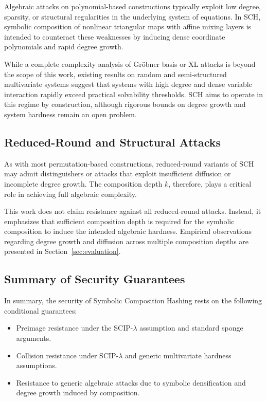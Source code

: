 ﻿\documentclass[english]{aucmcs}
\begin{document}
Algebraic attacks on polynomial-based constructions typically exploit low degree, sparsity, or structural regularities in the underlying system of equations. In SCH, symbolic composition of nonlinear triangular maps with affine mixing layers is intended to counteract these weaknesses by inducing dense coordinate polynomials and rapid degree growth.

While a complete complexity analysis of Gr\"obner basis or XL attacks is beyond the scope of this work, existing results on random and semi-structured multivariate systems suggest that systems with high degree and dense variable interaction rapidly exceed practical solvability thresholds. SCH aims to operate in this regime by construction, although rigorous bounds on degree growth and system hardness remain an open problem.



\subsection{Reduced-Round and Structural Attacks}

As with most permutation-based constructions, reduced-round variants of SCH may admit distinguishers or attacks that exploit insufficient diffusion or incomplete degree growth. The composition depth $k$, therefore, plays a critical role in achieving full algebraic complexity.

This work does not claim resistance against all reduced-round attacks. Instead, it emphasizes that sufficient composition depth is required for the symbolic composition to induce the intended algebraic hardness. Empirical observations regarding degree growth and diffusion across multiple composition depths are presented in Section~\ref{sec:evaluation}.



\subsection{Summary of Security Guarantees}

In summary, the security of Symbolic Composition Hashing rests on the following conditional guarantees:

\begin{itemize}
  \item Preimage resistance under the SCIP-$\lambda$ assumption and standard sponge arguments.
  \item Collision resistance under SCIP-$\lambda$ and generic multivariate hardness assumptions.
  \item Resistance to generic algebraic attacks due to symbolic densification and degree growth induced by composition.
\end{itemize}
\end{document}
